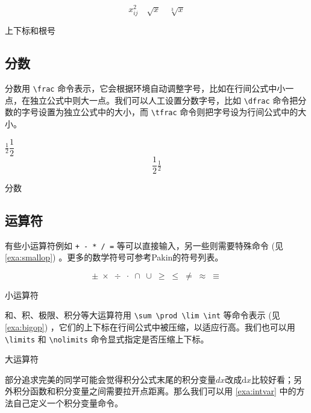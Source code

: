 \begin{example}[h]
\begin{BTDemo}[]
\[ x_{ij}^2\quad \sqrt{x}\quad \sqrt[3]{x} \]
\end{BTDemo}
\caption{上下标和根号}
\end{example}

\subsection{分数}

分数用 \verb|\frac| 命令表示，它会根据环境自动调整字号，比如在行间公式中小一点，在独立公式中则大一点。我们可以人工设置分数字号，比如 \verb|\dfrac| 命令把分数的字号设置为独立公式中的大小，而 \verb|\tfrac| 命令则把字号设为行间公式中的大小。

\begin{example}[h]
\begin{RLDemo}[]
$ \frac{1}{2} \dfrac{1}{2} $
\[ \frac{1}{2} 
    \tfrac{1}{2} \]
\end{RLDemo}
\caption{分数}
\end{example}

\subsection{运算符}

有些小运算符例如 \verb|+ - * / =| 等可以直接输入，另一些则需要特殊命令 (见 \autoref{exa:smallop}) 。更多的数学符号可参考Pakin\indexPakin 的符号列表\citep{Pakin_2008}。

\begin{example}[h]
\begin{BTDemo}[]
\[ \pm\; \times\; \div\; \cdot\; \cap\; \cup\; 
    \geq\; \leq\; \neq\; \approx\; \equiv \]
\end{BTDemo}
\caption{小运算符}
\label{exa:smallop}
\end{example}

和、积、极限、积分等大运算符用 \verb|\sum \prod \lim \int| 等命令表示 (见 \autoref{exa:bigop}) ，它们的上下标在行间公式中被压缩，以适应行高。我们也可以用 \verb|\limits| 和 \verb|\nolimits| 命令显式指定是否压缩上下标。

\begin{example}[h]
\caption{大运算符}
\label{exa:bigop}
\end{example}

部分追求完美的同学可能会觉得积分公式末尾的积分变量$dx$改成$\mathrm{d}x$比较好看；另外积分函数和积分变量之间需要拉开点距离。那么我们可以用 \autoref{exa:intvar} 中的方法自己定义一个积分变量命令。

